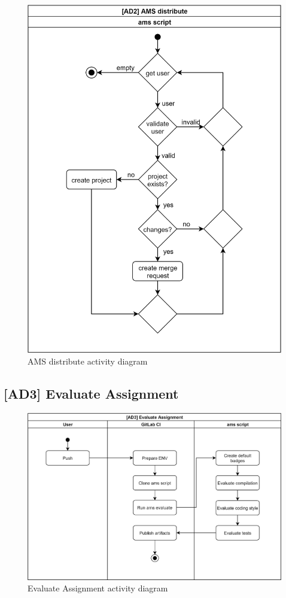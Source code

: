 \begin{figure}[H]
    \centering
    \includegraphics[width=\textwidth,height=\textheight,keepaspectratio]{Figures/ad/ad1.png}
    \caption{AMS distribute activity diagram}
\end{figure}

\subsection{{[}AD3{]} Evaluate Assignment} \label{ssec:ad3}

\begin{figure}[H]
    \centering
    \includegraphics[width=\textwidth,height=\textheight,keepaspectratio]{Figures/ad/ad13.png}
    \caption{Evaluate Assignment activity diagram}
\end{figure}

